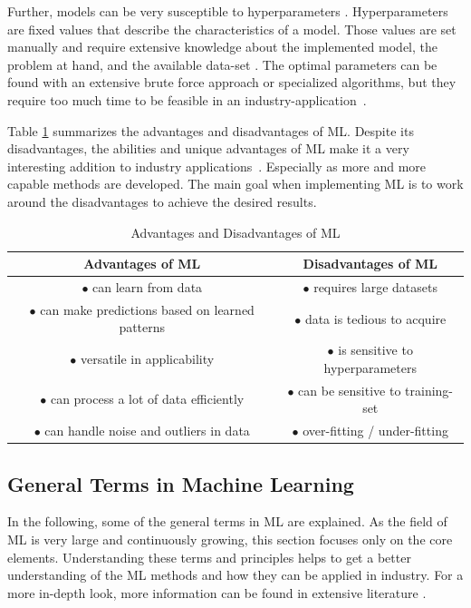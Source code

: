 Further, models can be very susceptible to hyperparameters \cite{Janiesch}. Hyperparameters are fixed values that describe the characteristics of a model. Those values are set manually and require extensive knowledge about the implemented model, the problem at hand, and the available data-set \cite{Luo}. The optimal parameters can be found with an extensive brute force approach or specialized algorithms, but they require too much time to be feasible in an industry-application~\cite{Claesen}. 

Table \ref{AdDis} summarizes the advantages and disadvantages of ML. Despite its disadvantages, the abilities and unique advantages of ML make it a very interesting addition to industry applications~\cite{Bertolini}. Especially as more and more capable methods are developed. The main goal when implementing ML is to work around the disadvantages to achieve the desired results.


\begin{table}
	\begin{center}
	\begin{tabular}{|| c | c ||}
		\hline
		\rule{0pt}{2ex}
		 Advantages of ML & Disadvantages of ML \\
		\hline
				\rule{0pt}{2ex} 
		$\bullet$ can learn from data & $\bullet$ requires large datasets \\
		$\bullet$ can make predictions based on learned patterns & $\bullet$ data is tedious to acquire\\	
		$\bullet$ versatile in applicability & $\bullet$ is sensitive to hyperparameters\\
		$\bullet$ can process a lot of data efficiently & $\bullet$ can be sensitive to training-set\\
		$\bullet$ can handle noise and outliers in data & $\bullet$ over-fitting / under-fitting\\
		\hline
	\end{tabular}
	\caption{Advantages and Disadvantages of ML}
	\label{AdDis}
\end{center}
\vspace{-4mm}
\end{table}


\subsection{General Terms in Machine Learning}
In the following, some of the general terms in ML are explained. As the field of ML is very large and continuously growing, this section focuses only on the core elements. Understanding these terms and principles helps to get a better understanding of the ML methods and how they can be applied in industry. For a more in-depth look, more information can be found in extensive literature \cite{Theodoridis, Bishop, google}.

